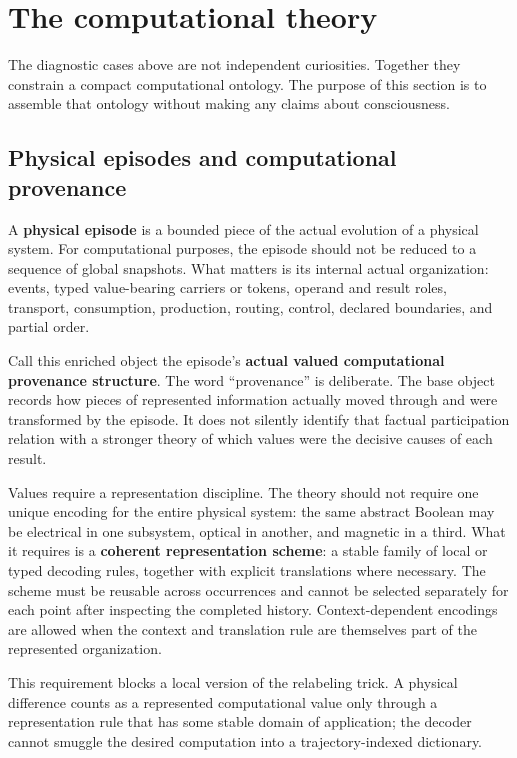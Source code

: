 \documentclass[11pt,a4paper]{article}
\begin{document}
\section{The computational theory}

The diagnostic cases above are not independent curiosities. Together they constrain a compact computational ontology. The purpose of this section is to assemble that ontology without making any claims about consciousness.

\subsection{Physical episodes and computational provenance}

A \textbf{physical episode} is a bounded piece of the actual evolution of a physical system. For computational purposes, the episode should not be reduced to a sequence of global snapshots. What matters is its internal actual organization: events, typed value-bearing carriers or tokens, operand and result roles, transport, consumption, production, routing, control, declared boundaries, and partial order.

Call this enriched object the episode's \textbf{actual valued computational provenance structure}. The word ``provenance'' is deliberate. The base object records how pieces of represented information actually moved through and were transformed by the episode. It does not silently identify that factual participation relation with a stronger theory of which values were the decisive causes of each result.

Values require a representation discipline. The theory should not require one unique encoding for the entire physical system: the same abstract Boolean may be electrical in one subsystem, optical in another, and magnetic in a third. What it requires is a \textbf{coherent representation scheme}: a stable family of local or typed decoding rules, together with explicit translations where necessary. The scheme must be reusable across occurrences and cannot be selected separately for each point after inspecting the completed history. Context-dependent encodings are allowed when the context and translation rule are themselves part of the represented organization.

This requirement blocks a local version of the relabeling trick. A physical difference counts as a represented computational value only through a representation rule that has some stable domain of application; the decoder cannot smuggle the desired computation into a trajectory-indexed dictionary.
\end{document}
